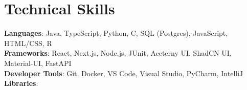 \documentclass[letterpaper,11pt]{article}
\begin{document}
%
\section{Technical Skills}
 \begin{itemize}[leftmargin=0.15in, label={}]
    \small{\item{
     \textbf{Languages}{: Java, TypeScript, Python, C, SQL (Postgres), JavaScript, HTML/CSS, R} \\
     \textbf{Frameworks}{: React, Next.js, Node.js, JUnit, Aceterny UI, ShadCN UI, Material-UI, FastAPI} \\
     \textbf{Developer Tools}{: Git, Docker, VS Code, Visual Studio, PyCharm, IntelliJ} \\
     \textbf{Libraries}{: } \\
    }}
 \end{itemize}


\end{document}
